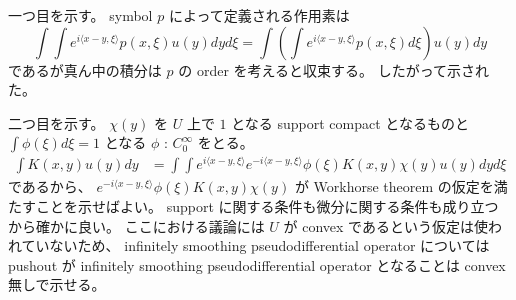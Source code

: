 \documentclass[dvipdfmx]{jsarticle}
\begin{document}
一つ目を示す。
symbol \(p\) によって定義される作用素は 
\[\int \int e^{i \langle x - y, \xi \rangle} p(x,\xi) u(y) dy d\xi = \int \left(\int e^{i \langle x-y,\xi \rangle} p(x,\xi) d\xi \right) u(y) dy\]
であるが真ん中の積分は \(p\) の order を考えると収束する。
したがって示された。

二つ目を示す。
\(\chi(y)\) を \(U\) 上で \(1\) となる support compact となるものと \(\int \phi(\xi) d\xi = 1\) となる \(\phi\) : \(C^\infty_0\) をとる。
\begin{align*}
  \int K(x,y) u(y) dy
  &= \int \int e^{i \langle x-y , \xi \rangle} e^{- i \langle x-y , \xi \rangle} \phi(\xi) K(x,y) \chi(y) u(y) dy d\xi
\end{align*}
であるから、 \(e^{- i \langle x-y , \xi \rangle} \phi(\xi) K(x,y) \chi(y)\) が Workhorse theorem の仮定を満たすことを示せばよい。
support に関する条件も微分に関する条件も成り立つから確かに良い。
ここにおける議論には \(U\) が convex であるという仮定は使われていないため、 infinitely smoothing pseudodifferential operator については pushout が infinitely smoothing pseudodifferential operator となることは convex 無しで示せる。
\end{document}
